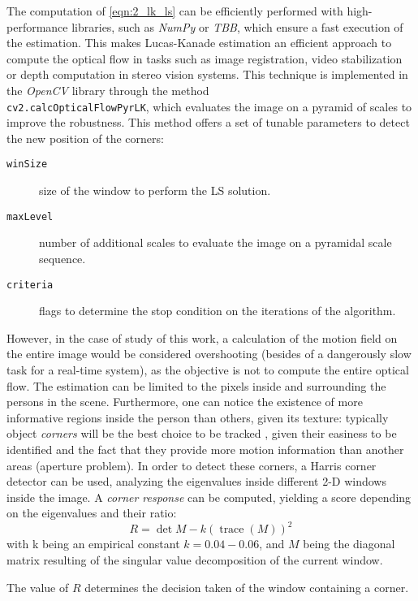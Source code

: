The computation of \autoref{eqn:2_lk_ls} can be efficiently performed with high-performance libraries, such as \textit{NumPy} or \textit{TBB}, which ensure a fast execution of the estimation. This makes Lucas-Kanade estimation an efficient approach to compute the optical flow in tasks such as image registration, video stabilization or depth computation in stereo vision systems. This technique is implemented in the \textit{OpenCV} library through the method\\ \texttt{cv2.calcOpticalFlowPyrLK}, which evaluates the image on a pyramid of scales to improve the robustness. This method offers a set of tunable parameters to detect the new position of the corners:

\begin{description}
	\item[\texttt{winSize}] size of the window to perform the LS solution.
	\item[\texttt{maxLevel}] number of additional scales to evaluate the image on a pyramidal scale sequence.
	\item[\texttt{criteria}] flags to determine the stop condition on the iterations of the algorithm.
\end{description}

However, in the case of study of this work, a calculation of the motion field on the entire image would be considered overshooting (besides of a dangerously slow task for a real-time system), as the objective is not to compute the entire optical flow. The estimation can be limited to the pixels inside and surrounding the persons in the scene. Furthermore, one can notice the existence of more informative regions inside the person than others, given its texture: typically object \textit{corners} will be the best choice to be tracked \cite{diapos_cv_features}, given their easiness to be identified and the fact that they provide more motion information than another areas (aperture problem). In order to detect these corners, a Harris corner detector can be used, analyzing the eigenvalues inside different 2-D windows inside the image. A \textit{corner response} can be computed, yielding a score depending on the eigenvalues and their ratio:
$$
R = \det M - k(\operatorname{trace}(M))^2
$$
with k being an empirical constant $k=0.04-0.06$, and $M$ being the diagonal matrix resulting of the singular value decomposition of the current window.

The value of $R$ determines the decision taken of the window containing a corner.

